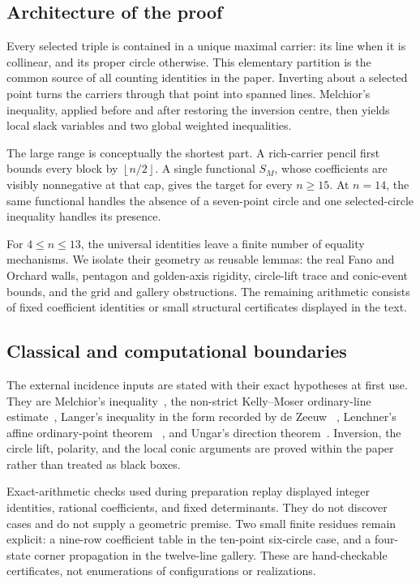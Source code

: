 \documentclass[11pt]{article}
\theoremstyle{definition}
\theoremstyle{remark}
\newcommand{\floor}[1]{\left\lfloor #1\right\rfloor}
\begin{document}
\subsection*{Architecture of the proof}

Every selected triple is contained in a unique maximal carrier: its line
when it is collinear, and its proper circle otherwise.  This elementary
partition is the common source of all counting identities in the paper.
Inverting about a selected point turns the carriers through that point into
spanned lines.  Melchior's inequality, applied before and after restoring
the inversion centre, then yields local slack variables and two global
weighted inequalities.

The large range is conceptually the shortest part.  A rich-carrier pencil
first bounds every block by \(\floor{n/2}\).  A single functional
\(S_M\), whose coefficients are visibly nonnegative at that cap, gives the
target for every \(n\ge15\).  At \(n=14\), the same functional handles the
absence of a seven-point circle and one selected-circle inequality handles
its presence.

For \(4\le n\le13\), the universal identities leave a finite number of
equality mechanisms.  We isolate their geometry as reusable lemmas:
the real Fano and Orchard walls, pentagon and golden-axis rigidity,
circle-lift trace and conic-event bounds, and the grid and gallery
obstructions.  The remaining arithmetic consists of fixed coefficient
identities or small structural certificates displayed in the text.

\subsection*{Classical and computational boundaries}

The external incidence inputs are stated with their exact hypotheses at
first use.  They are Melchior's inequality~\cite{Melchior1940}, the
non-strict Kelly--Moser ordinary-line estimate~\cite{KellyMoser1958},
Langer's inequality in the form recorded by de Zeeuw
~\cite{Langer2003,DeZeeuw2018}, Lenchner's affine ordinary-point theorem
~\cite{Lenchner2007}, and Ungar's direction theorem~\cite{Ungar1982}.
Inversion, the
circle lift, polarity, and the local conic arguments are proved within the
paper rather than treated as black boxes.

Exact-arithmetic checks used during preparation replay displayed integer
identities, rational coefficients, and fixed determinants.  They do not
discover cases and do not supply a geometric premise.  Two small
finite residues remain explicit: a nine-row coefficient table in the
ten-point six-circle case, and a four-state corner propagation in the
twelve-line gallery.  These are hand-checkable certificates, not
enumerations of configurations or realizations.
\end{document}
